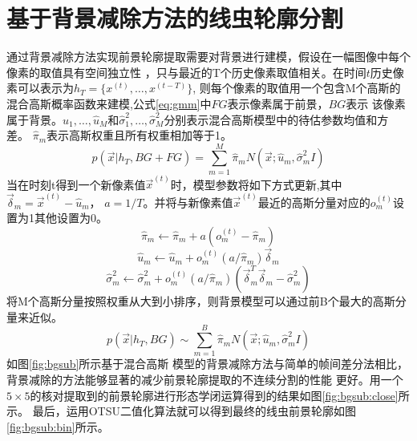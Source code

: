 \section{基于背景减除方法的线虫轮廓分割}
	通过背景减除方法实现前景轮廓提取需要对背景进行建模，假设在一幅图像中每个像素的取值具有空间独立性
	，只与最近的T个历史像素取值相关。在时间$t$历史像素可以表示为$h_T=\{x^{(t)},\dots,x^{(t-T)}\}$,
	则每个像素的取值用一个包含M个高斯的混合高斯概率函数来建模,公式\ref{eq:gmm}中$FG$表示像素属于前景，$BG$表示
	该像素属于背景。$\hat{u}_1,\dots,\hat{u}_M$和$\hat{\sigma}_1^2,\dots,\hat{\sigma}_M^2$分别表示混合高斯模型中的待估参数均值和方差。
	$\hat{\pi}_m$表示高斯权重且所有权重相加等于1。
	\begin{equation}
		p(\vec{x}|h_T,BG+FG)= \sum_{m=1}^{M} \hat{\pi}_{m}N(\vec{x};\hat{u}_m,\hat{\sigma}_m^2I)\label{eq:gmm}
	\end{equation}
	当在时刻t得到一个新像素值$\vec{x}^{(t)}$时，模型参数将如下方式更新,其中$\vec{\delta}_m=\vec{x}^{(t)}-\hat{u}_m$，
	$a=1/T$。并将与新像素值$\vec{x}^{(t)}$最近的高斯分量对应的$o_m^{(t)}$设置为1其他设置为0。
	\begin{equation}
		\hat{\pi}_m \leftarrow \hat{\pi}_m +a(o_m^{(t)}-\hat{\pi}_m) \label{eq:updata}
	\end{equation}
	\begin{equation}
		\hat{u}_m \leftarrow \hat{u}_m +o_m^{(t)}(a/\hat{\pi}_m)\vec{\delta}_m \label{eq:updata1}
	\end{equation}
	\begin{equation}
		\hat{\sigma}_m^2 \leftarrow \hat{\sigma}_m^2 +o_m^{(t)}(a/\hat{\pi}_m)(\vec{\delta}_m^T\vec{\delta}_m-\hat{\sigma}_m^2) \label{eq:updata2}
	\end{equation}
	将M个高斯分量按照权重从大到小排序，则背景模型可以通过前B个最大的高斯分量来近似。
	\begin{equation}
		p(\vec{x}|h_T,BG) \sim \sum_{m=1}^{B} \hat{\pi}_{m}N(\vec{x};\hat{u}_m,\hat{\sigma}_m^2I)\label{eq:bg}
	\end{equation}
	如图\ref{fig:bgsub}所示基于混合高斯
	模型的背景减除方法与简单的帧间差分法相比，背景减除的方法能够显著的减少前景轮廓提取的不连续分割的性能
	更好。用一个$5\times5$的核对提取到的前景轮廓进行形态学闭运算得到的结果如图\ref{fig:bgsub:close}所示。
	最后，运用OTSU二值化算法就可以得到最终的线虫前景轮廓如图\ref{fig:bgsub:bin}所示。

